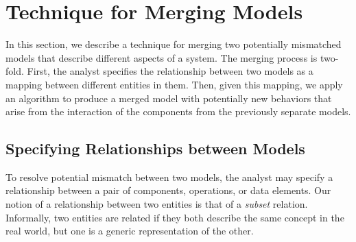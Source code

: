 
\section{Technique for Merging Models}
\label{sec-merging}

In this section, we describe a technique for merging two potentially
mismatched models that describe different aspects of a system. The
merging process is two-fold. First, the analyst specifies the
relationship between two models as a mapping between different
entities in them. Then, given this mapping, we apply an algorithm to
produce a merged model with potentially new behaviors that arise
from the interaction of the components from the previously separate
models.

\subsection{Specifying Relationships between Models}
\label{sec-relationship}

To resolve potential mismatch between two models, the analyst may
specify a relationship between a pair of components, operations, or data
elements. Our notion of a relationship between two entities is that of
a \textit{subset} relation. Informally, two entities are related if
they both describe the same concept in the real world, but one is a
generic representation of the other. 


